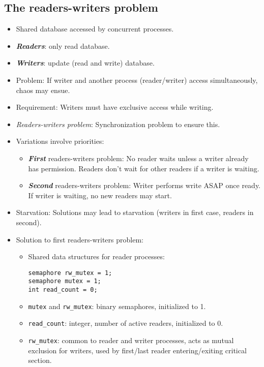 \subsection{The readers-writers problem}
\begin{itemize}
    \item Shared database accessed by concurrent processes.
    \item \textbf{\textit{Readers}}: only read database.
    \item \textbf{\textit{Writers}}: update (read and write) database.
    \item Problem: If writer and another process (reader/writer) access simultaneously, chaos may ensue.
    \item Requirement: Writers must have exclusive access while writing.
    \item \textit{Readers-writers problem}: Synchronization problem to ensure this.
    \item Variations involve priorities:
    \begin{itemize}
        \item \textbf{\textit{First}} readers-writers problem: No reader waits unless a writer already has permission. Readers don't wait for other readers if a writer is waiting.
        \item \textbf{\textit{Second}} readers-writers problem: Writer performs write ASAP once ready. If writer is waiting, no new readers may start.
    \end{itemize}
    \item Starvation: Solutions may lead to starvation (writers in first case, readers in second).
    \item Solution to first readers-writers problem:
    \begin{itemize}
        \item Shared data structures for reader processes:
        \begin{verbatim}
semaphore rw_mutex = 1;
semaphore mutex = 1;
int read_count = 0;
\end{verbatim}
        \item \texttt{mutex} and \texttt{rw\_mutex}: binary semaphores, initialized to 1.
        \item \texttt{read\_count}: integer, number of active readers, initialized to 0.
        \item \texttt{rw\_mutex}: common to reader and writer processes, acts as mutual exclusion for writers, used by first/last reader entering/exiting critical section.

\end{itemize}
\end{itemize}
